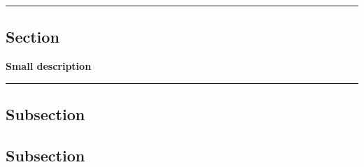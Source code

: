 {\color{gray}\hrule}
\begin{center}
\section{Section}
\textbf{Small description}
\bigskip
\end{center}
{\color{gray}\hrule}
\subsection{Subsection}
\lipsum[1-3]
\subsection{Subsection}
\lipsum[1-2]


